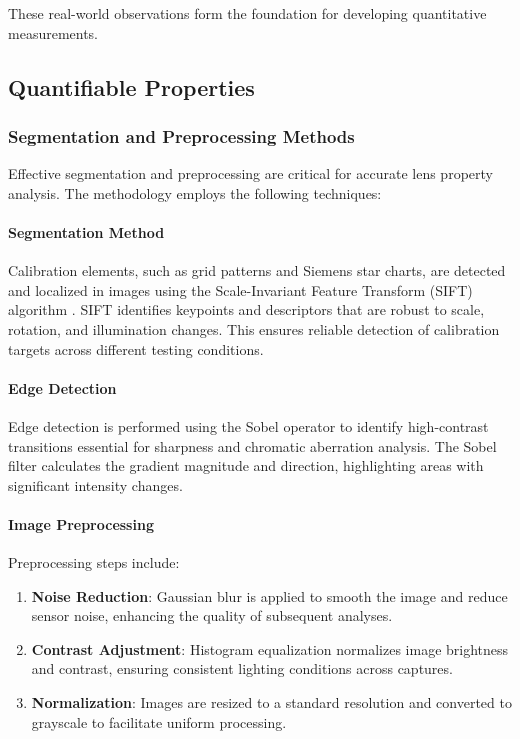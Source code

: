 These real-world observations form the foundation for developing quantitative measurements.

\subsection{Quantifiable Properties}

\subsubsection{Segmentation and Preprocessing Methods}
Effective segmentation and preprocessing are critical for accurate lens property analysis. The methodology employs the following techniques:

\paragraph{Segmentation Method}
Calibration elements, such as grid patterns and Siemens star charts, are detected and localized in images using the Scale-Invariant Feature Transform (SIFT) algorithm \cite{Sift}. SIFT identifies keypoints and descriptors that are robust to scale, rotation, and illumination changes. This ensures reliable detection of calibration targets across different testing conditions.

\paragraph{Edge Detection}
Edge detection is performed using the Sobel operator to identify high-contrast transitions essential for sharpness and chromatic aberration analysis. The Sobel filter calculates the gradient magnitude and direction, highlighting areas with significant intensity changes.

\paragraph{Image Preprocessing}
Preprocessing steps include:
\begin{enumerate}
    \item \textbf{Noise Reduction}: Gaussian blur is applied to smooth the image and reduce sensor noise, enhancing the quality of subsequent analyses.
    \item \textbf{Contrast Adjustment}: Histogram equalization normalizes image brightness and contrast, ensuring consistent lighting conditions across captures.
    \item \textbf{Normalization}: Images are resized to a standard resolution and converted to grayscale to facilitate uniform processing.
\end{enumerate}

